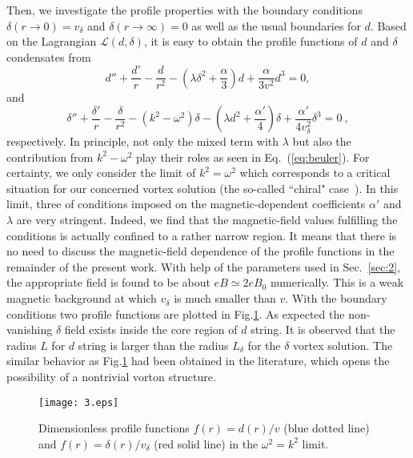 \documentclass[12pt]{article}
\begin{document}
Then, we investigate the profile properties with the boundary conditions $\delta(r \rightarrow 0) = v_\delta$ and $\delta(r \rightarrow \infty) = 0$ as well as the usual boundaries for $d$.
Based on the Lagrangian $\mathcal{L}(d,\delta)$, it is easy to obtain the profile functions of $d$ and $\delta$ condensates from
\begin{equation}
  \label{eq:deuler}
  d'' +\frac{d'}{r} - \frac{d}{r^2} - (\lambda \delta^2 + \frac{\alpha}{3})d + \frac{\alpha}{3v^2}d^3 = 0,
\end{equation}
and
\begin{equation}
  \label{eq:beuler}
  \delta'' +\frac{\delta'}{r} - \frac{\delta}{r^2} - (k^2 - \omega^2)\delta - (\lambda d^2 + \frac{\alpha'}{4})\delta + \frac{\alpha'}{4v_\delta^2}\delta^3 = 0 \ ,
\end{equation}
respectively. In principle, not only the mixed term with $\lambda$ but also the contribution from $k^2-\omega^2$ play their roles as seen in Eq.~(\ref{eq:beuler}). For certainty, we only consider the limit of $k^2=\omega^2$ which corresponds to a
critical situation for our concerned vortex solution (the so-called ``chiral" case~\cite{lemperiere2003behaviour}).
In this limit, three of conditions imposed on the magnetic-dependent coefficients $\alpha'$ and $\lambda$ are very stringent.
Indeed, we find that the magnetic-field values fulfilling the conditions is actually confined to a
rather narrow region.
It means that there is no need to discuss the magnetic-field dependence of the profile functions in the remainder of the present work.
With help of the parameters used in Sec.~\ref{sec:2}, the appropriate field is found to be about $eB \simeq 2 eB_0$ numerically. This is a weak magnetic background at which $v_\delta$ is much smaller than $v$.
With the boundary conditions two profile functions are plotted in Fig.\ref{fig:3}.
As expected the non-vanishing $\delta$ field exists inside the core region of $d$ string.
It is observed that the radius $L$ for $d$ string is larger than the radius $L_\delta$ for the
$\delta$ vortex solution.
The similar behavior as Fig.\ref{fig:3} had been obtained in the literature, which opens the
possibility of a nontrivial vorton structure.

\begin{figure}
	\texttt{[image: 3.eps]}
	\caption{Dimensionless profile functions $f(r)=d(r)/v$ (blue dotted line) and
     $f(r)=\delta(r)/v_\delta$ (red solid line) in the $\omega^2 = k^2$ limit.
     }
	\label{fig:3}
\end{figure}
\end{document}

